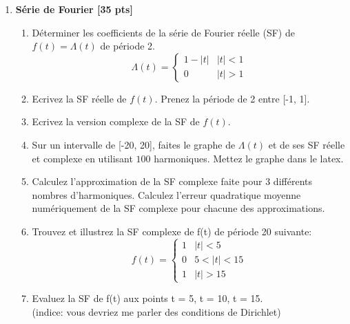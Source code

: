 \documentclass{article}
\begin{document}
\begin{enumerate}
\item {\bf Série de Fourier [35 pts]}
  \begin{enumerate}
    \vspace{0.5cm}
  \item Déterminer les coefficients de la série de Fourier réelle (SF)
    de $f(t) = \Lambda(t)$ de période 2. %
    $$
    \Lambda(t) = \left \{
      \begin{array}{cl}
        1 - |t| &   |t| < 1 \\
        0 & |t| > 1
      \end{array} \right .
    $$  
    \vspace{1cm}
  \item Ecrivez la SF réelle de $f(t)$. Prenez la période de 2 entre
    [-1, 1]. 
    \vspace{1cm}    
  \item Ecrivez la version complexe de
    la SF de $f(t)$. 
    \vspace{1cm}    
  \item Sur un intervalle de [-20, 20], faites le graphe
    de $\Lambda(t)$ et de ses SF réelle et complexe en utilisant $100$
    harmoniques. Mettez le graphe dans le latex. 
    \vspace{1cm}    
  \item Calculez l'approximation de la SF complexe
    faite pour 3 différents nombres d'harmoniques. Calculez
    l'erreur quadratique moyenne numériquement de la
    SF complexe pour chacune des approximations. 
    \vspace{1cm}
  \item Trouvez et illustrez la SF complexe de f(t) de période 20 suivante:  
      $$
      f(t) = \left \{
        \begin{array}{cl}
          1   & |t| < 5 \\
          0   & 5 < |t| < 15 \\
          1   & |t| > 15
        \end{array} \right .
      $$  
      \vspace{1cm}
    \item Evaluez la SF de f(t) aux points t = 5, t = 10, t =
      15. \\
      (indice: vous devriez me parler des conditions de Dirichlet)
      
    \end{enumerate}
\vspace{1cm}

\newpage


\end{enumerate}
\end{document}
